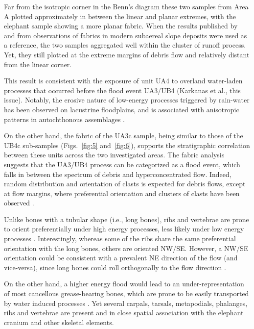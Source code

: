 \documentclass[review,authoryear,times]{elsarticle} %
\begin{document}
Far from the isotropic corner in the Benn's diagram these two samples from Area A plotted approximately in between the linear and planar extremes, with the elephant sample showing a more planar fabric. When the results published by \cite{Bertran1997} and \cite{Lenoble2004} from observations of fabrics in modern subaereal slope deposits were used as a reference, the two samples aggregated well within the cluster of runoff process. Yet, they still plotted at the extreme margins of debris flow and relatively distant from the linear corner.

This result is consistent with the exposure of unit UA4 to overland water-laden processes that occurred before the flood event UA3/UB4 (Karkanas et al., this issue). Notably, the erosive nature of low-energy processes triggered by rain-water has been observed on lacustrine floodplains, and is associated with anisotropic patterns in autochthonous assemblages \citep{Cobo-Sanchez2014,Dominguez-Rodrigo2014,Garcia-Moreno2016}.

On the other hand, the fabric of the UA3c sample, being similar to those of the UB4c sub-samples (Figs.~\ref{fig:5} and~\ref{fig:6}), supports the stratigraphic correlation between these units across the two investigated areas. The fabric analysis suggests that the UA3/UB4 process can be categorized as a flood event, which falls in between the spectrum of debris and hyperconcentrated flow. Indeed, random distribution and orientation of clasts is expected for debris flows, except at flow margins, where preferential orientation and clusters of clasts have been observed \citep{Pierson2005}. %

Unlike bones with a tubular shape (i.e., long bones), ribs and vertebrae are prone to orient preferentially under high energy processes, less likely under low energy processes \citep{Dominguez-Rodrigo2013,Dominguez-Rodrigo2014}. Interestingly, whereas some of the ribs share the same preferential orientation with the long bones, others are oriented NW/SE. However, a NW/SE orientation could be consistent with a prevalent NE direction of the flow (and vice-versa), since long bones could roll orthogonally to the flow direction \citep{Voorhies1966}.

On the other hand, a higher energy flood would lead to an under-representation of most cancellous grease-bearing bones, which are prone to be easily transported by water induced processes \citep{Voorhies1966}. Yet several carpals, tarsals, metapodials, phalanges, ribs and vertebrae are present and in close spatial association with the elephant cranium and other skeletal elements.
\end{document}

